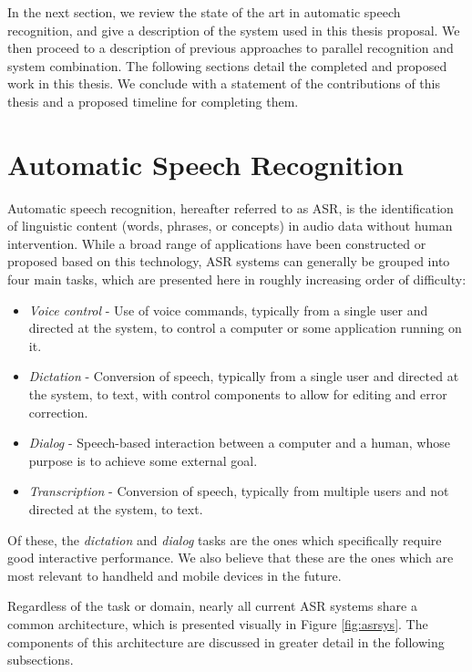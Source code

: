 \documentclass{article}
\begin{document}
In the next section, we review the state of the art in automatic
speech recognition, and give a description of the system used in this
thesis proposal.  We then proceed to a description of previous
approaches to parallel recognition and system combination.  The
following sections detail the completed and proposed work in this
thesis.  We conclude with a statement of the contributions of this
thesis and a proposed timeline for completing them.

\section{Automatic Speech Recognition}
\label{sec:asr}

Automatic speech recognition, hereafter referred to as ASR, is the
identification of linguistic content (words, phrases, or concepts) in
audio data without human intervention.  While a broad range of
applications have been constructed or proposed based on this
technology, ASR systems can generally be grouped into four main tasks,
which are presented here in roughly increasing order of difficulty:

\begin{itemize}
\item {\em Voice control} - Use of voice commands, typically from a
  single user and directed at the system, to control a computer or
  some application running on it.
\item {\em Dictation} - Conversion of speech, typically from a single
  user and directed at the system, to text, with control components to
  allow for editing and error correction.
\item {\em Dialog} - Speech-based interaction between a computer and a
  human, whose purpose is to achieve some external goal.
\item {\em Transcription} - Conversion of speech, typically from
  multiple users and not directed at the system, to text.
\end{itemize}

Of these, the {\em dictation} and {\em dialog} tasks are the ones
which specifically require good interactive performance.  We also
believe that these are the ones which are most relevant to handheld
and mobile devices in the future.

Regardless of the task or domain, nearly all current ASR systems share
a common architecture, which is presented visually in Figure
\ref{fig:asrsys}.  The components of this architecture are discussed
in greater detail in the following subsections.
\end{document}
